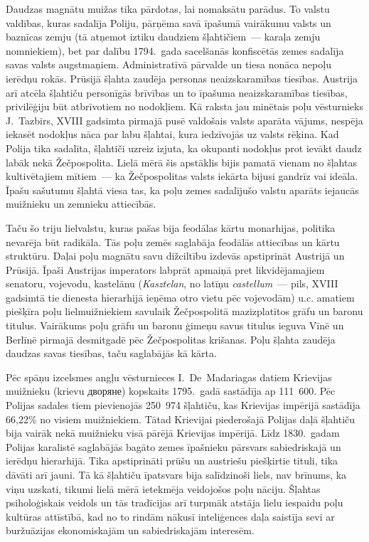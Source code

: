 \documentclass[twoside,a5paper,12pt,fleqn,openany]{extbook}
\newcommand{\pltxti}[1]{\textit{\textpolish{#1}}}
\newcommand{\rutxti}[1]{\textrussian{#1}}
\newcommand{\latxti}[1]{\textit{\textlatin{#1}}}
\begin{document}
Daudzas magnātu muižas tika pārdotas, lai nomaksātu parādus. To valstu valdības, kuras sadalīja Poliju, pārņēma savā īpašumā vairākumu valsts un baznīcas zemju (tā atņemot iztiku daudziem šļahtičiem~--- karaļa zemju nomniekiem), bet par dalību 1794.~gada sacelšanās konfiscētās zemes sadalīja savas valsts augstmaņiem. Administratīvā pārvalde un tiesa nonāca nepoļu ierēdņu rokās. Prūsijā šļahta zaudēja personas neaizskaramības tiesības. Austrija arī atcēla šļahtiču personīgās brīvības un to īpašuma neaizskaramības tiesības, privilēģiju būt atbrīvotiem no nodokļiem. Kā raksta jau minētais poļu vēsturnieks J.~Tazbirs, XVIII gadsimta pirmajā pusē valdošais valsts aparāta vājums, nespēja iekasēt nodokļus nāca par labu šļahtai, kura iedzīvojās uz valsts rēķina. Kad Polija tika sadalīta, šļahtiči uzreiz izjuta, ka okupanti nodokļus prot ievākt daudz labāk nekā Žečpospolita. Lielā mērā šis apstāklis bijis pamatā vienam no šļahtas kultivētajiem mītiem~--- ka Žečpospolitas valsts iekārta bijusi gandrīz vai ideāla. Īpašu sašutumu šļahtā viesa tas, ka poļu zemes sadalījušo valstu aparāts iejaucās muižnieku un zemnieku attiecībās.

Taču šo triju lielvalstu, kuras pašas bija feodālas kārtu monarhijas, politika nevarēja būt radikāla. Tās poļu zemēs saglabāja feodālās attiecības un kārtu struktūru. Daļai poļu magnātu savu dižciltību izdevās apstiprināt Austrijā un Prūsijā. Īpaši Austrijas imperators labprāt apmaiņā pret likvidējamajiem senatoru, vojevodu, kastelānu (\pltxti{Kasztelan}, no latīņu \latxti{castellum}~--- pils, XVIII gadsimtā tie dienesta hierarhijā ieņēma otro vietu pēc vojevodām) u.c. amatiem piešķīra poļu lielmuižniekiem savulaik Žečpospolitā mazizplatītos grāfu un baronu titulus. Vairākums poļu grāfu un baronu ģimeņu savus titulus ieguva Vīnē un Berlīnē pirmajā desmitgadē pēc Žečpospolitas krišanas. Poļu šļahta zaudēja daudzas savas tiesības, taču saglabājās kā kārta.

Pēc spāņu izcelsmes angļu vēsturnieces I.~De~Madariagas datiem Krievijas muižnieku (krievu \rutxti{дворяне}) kopskaits 1795.~gadā sastādīja ap 111~600. Pēc Polijas sadales tiem pievienojās 250~974 šļahtiču, kas Krievijas impērijā sastādīja 66,22\% no visiem muižniekiem. Tātad Krievijai piederošajā Polijas daļā šļahtiču bija vairāk nekā muižnieku visā pārējā Krievijas impērijā. Līdz 1830.~gadam Polijas karalistē saglabājās bagāto zemes īpašnieku pārsvars sabiedriskajā un ierēdņu hierarhijā. Tika apstiprināti prūšu un austriešu piešķirtie tituli, tika dāvāti arī jauni. Tā kā šļahtiču īpatsvars bija salīdzinoši liels, nav brīnums, ka viņu uzskati, tikumi lielā mērā ietekmēja veidojošos poļu nāciju. Šļahtas psiholoģiskais veidols un tās tradīcijas arī turpmāk atstāja lielu iespaidu poļu kultūras attīstībā, kad no to rindām nākusī inteliģences daļa saistīja sevi ar buržuāzijas ekonomiskajām un sabiedriskajām interesēm.
\end{document}

